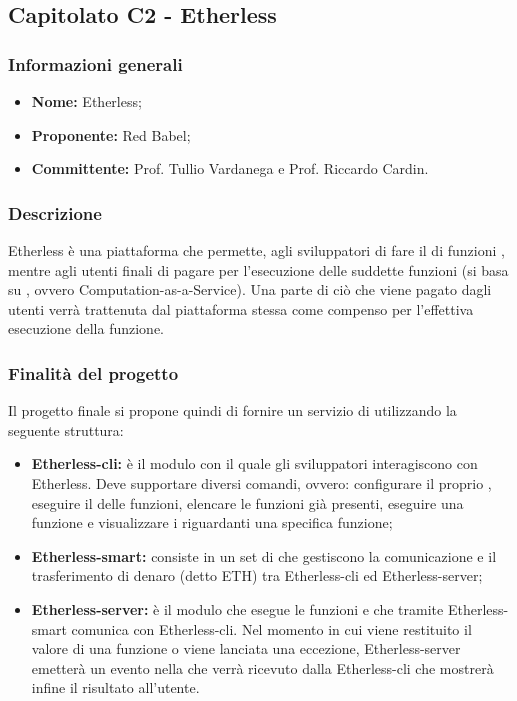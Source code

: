 \subsection{Capitolato C2 - Etherless}
	 \subsubsection{Informazioni generali}
       	\begin{itemize}
						\item \textbf{Nome:} Etherless;
         	  \item \textbf{Proponente: }Red Babel;
          	\item \textbf{Committente: }Prof. Tullio Vardanega e Prof. Riccardo Cardin.
         \end{itemize}
	\subsubsection{Descrizione}
       Etherless è una piattaforma  che permette, agli sviluppatori di fare il  di funzioni , mentre  agli utenti finali di pagare per l'esecuzione delle suddette funzioni (si basa su , ovvero Computation-as-a-Service).
       Una parte di ciò che viene pagato dagli utenti verrà trattenuta dal piattaforma stessa come compenso per l'effettiva esecuzione della funzione.
    \subsubsection{Finalità del progetto}
     Il progetto finale si propone quindi di fornire un servizio di  utilizzando la seguente struttura:
    		 \begin{itemize}
    			\item \textbf{Etherless-cli: }è il modulo con il quale gli sviluppatori interagiscono con Etherless. Deve supportare diversi comandi, ovvero: configurare il proprio , eseguire il  delle funzioni, elencare le funzioni già presenti, eseguire una funzione e visualizzare i  riguardanti una specifica funzione;
    			\item \textbf{Etherless-smart: }consiste in un set di  che gestiscono la comunicazione e il trasferimento di denaro (detto ETH) tra Etherless-cli ed Etherless-server;
    			\item \textbf{Etherless-server: }è il modulo che esegue le funzioni e che tramite Etherless-smart comunica con Etherless-cli.  Nel momento in cui viene restituito il valore di una funzione o viene lanciata una eccezione, Etherless-server emetterà un evento nella  che verrà ricevuto dalla Etherless-cli che mostrerà infine il risultato all'utente.
		\end{itemize}
